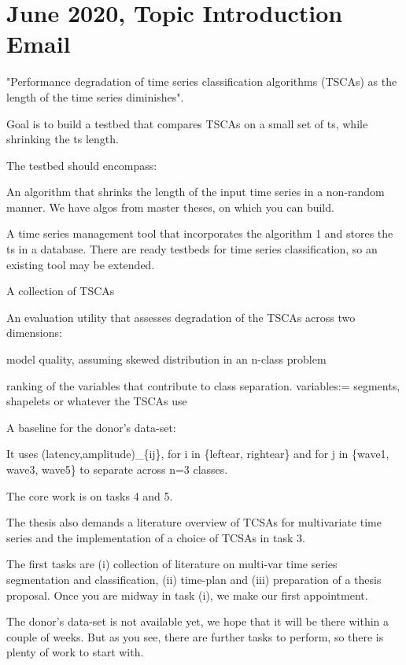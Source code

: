 \documentclass{article}
\begin{document}
\section*{\texorpdfstring{}. June 2020, Topic Introduction Email}
"Performance degradation of time series classification algorithms (TSCAs) as the length of the time series diminishes".
\begin{todolist}
	\item Goal is to build a testbed that compares TSCAs on a small set of ts, while shrinking the ts length.
	\item The testbed should encompass:
		 \begin{todolist}
			\item An algorithm that shrinks the length of the input time series
			 in a non-random manner.\newline
			 We have algos from master theses, on which you can build.
			\item A time series management tool that incorporates the algorithm 1
			 and stores the ts in a database.\newline
			 There are ready testbeds for time series classification, so an existing tool may be extended.
			\item A collection of TSCAs
			\item An evaluation utility that assesses degradation of the TSCAs across
			 two dimensions:
				\begin{todolist}
					\item model quality, assuming skewed distribution in an n-class problem
					\item ranking of the variables that contribute to class separation.\newline
					variables:= segments, shapelets or whatever the TSCAs use
				\end{todolist}
			\item A baseline for the donor's data-set:
				\begin{todolist}
					\item It uses (latency,amplitude)\_\{ij\}, for i in \{leftear, rightear\} and for j in \{wave1, wave3, wave5\} to separate across n=3 classes.
				\end{todolist}
		 \end{todolist}
	\item The core work is on tasks 4 and 5.
	\item The thesis also demands a literature overview of TCSAs for multivariate time series and the implementation of a choice of TCSAs in task 3.
	\item The first tasks are (i) collection of literature on multi-var time series segmentation and classification, (ii) time-plan and (iii) preparation of a thesis proposal. Once you are midway in task (i), we make our first appointment.
	\item The donor's data-set is not available yet, we hope that it will be there within a couple  of weeks. But as you see, there are further tasks to perform, so there is plenty of work to start with.
 \end{todolist}
\end{document}
